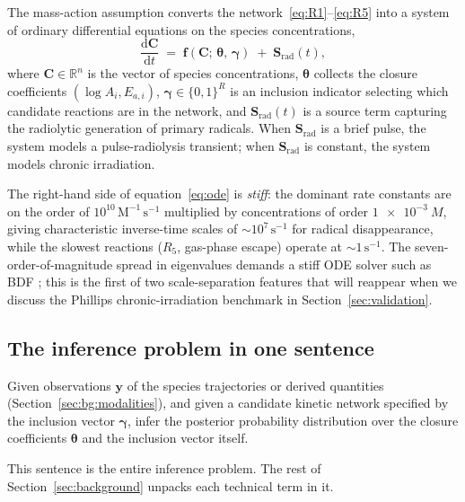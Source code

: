 \documentclass[12pt]{article}
\theoremstyle{plain}
\theoremstyle{definition}
\theoremstyle{remark}
\renewcommand{\d}{\mathrm{d}}
\newcommand{\R}{\mathbb{R}}
\begin{document}
The mass-action assumption converts the network~\eqref{eq:R1}--\eqref{eq:R5}
into a system of ordinary differential equations on the species
concentrations,
%
\begin{equation}
  \frac{\d \mathbf{C}}{\d t} \;=\; \mathbf{f}(\mathbf{C};\,\boldsymbol{\theta},\,\boldsymbol\gamma)
  \;+\; \mathbf{S}_{\mathrm{rad}}(t),
  \label{eq:ode}
\end{equation}
%
where $\mathbf{C}\in\R^{n}$ is the vector of species concentrations,
$\boldsymbol{\theta}$ collects the closure coefficients $(\log A_i, E_{a,i})$,
$\boldsymbol\gamma\in\{0,1\}^R$ is an inclusion indicator selecting which
candidate reactions are in the network, and $\mathbf{S}_{\mathrm{rad}}(t)$ is a
source term capturing the radiolytic generation of primary radicals.  When
$\mathbf{S}_{\mathrm{rad}}$ is a brief pulse, the system models a
pulse-radiolysis transient; when $\mathbf{S}_{\mathrm{rad}}$ is constant, the
system models chronic irradiation.

The right-hand side of equation~\eqref{eq:ode} is \emph{stiff}:  the dominant
rate constants are on the order of $10^{10}\,\mathrm{M}^{-1}\,\mathrm{s}^{-1}$
multiplied by concentrations of order $\SI{1e-3}{M}$, giving characteristic
inverse-time scales of $\sim 10^7\,\mathrm{s}^{-1}$ for radical disappearance,
while the slowest reactions ($R_5$, gas-phase escape) operate at
$\sim 1\,\mathrm{s}^{-1}$.  The seven-order-of-magnitude spread in eigenvalues
demands a stiff ODE solver such as BDF \citep{Hindmarsh2005}; this is the first
of two scale-separation features that will reappear when we discuss the
Phillips chronic-irradiation benchmark in Section~\ref{sec:validation}.

\subsection{The inference problem in one sentence}

Given observations $\mathbf{y}$ of the species trajectories or derived
quantities (Section~\ref{sec:bg:modalities}), and given a candidate kinetic
network specified by the inclusion vector $\boldsymbol\gamma$, infer the
posterior probability distribution over the closure coefficients
$\boldsymbol{\theta}$ and the inclusion vector itself.

This sentence is the entire inference problem.  The rest of
Section~\ref{sec:background} unpacks each technical term in it.
\end{document}

